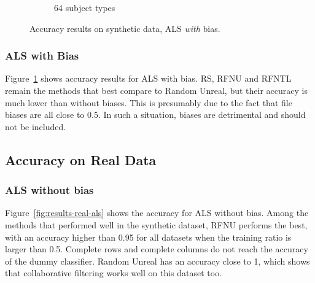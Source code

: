 \documentclass[10pt, conference, compsocconf]{IEEEtran}
\begin{document}
\begin{figure}
\begin{subfigure}[b]{0.3\textwidth}
        \caption{64 subject types}
\end{subfigure}
\caption{Accuracy results on synthetic data, ALS \emph{with} bias.}
\label{fig:results-synthetic-als-bias}
\end{figure}

\subsubsection{ALS with Bias}

Figure~\ref{fig:results-synthetic-als-bias} shows accuracy results for 
ALS with bias. RS, RFNU and RFNTL remain the methods that best compare 
to Random Unreal, but their accuracy is much lower than without 
biases. This is presumably due to 
the fact that file biases are all close to 0.5. 
In such a situation, biases are detrimental and should not be included.

\subsection{Accuracy on  Real Data}

\subsubsection{ALS without bias}

Figure~\ref{fig:results-real-als} shows the accuracy for ALS without bias. Among the methods that performed 
well in the synthetic dataset, RFNU performs the best, with an accuracy 
higher than 0.95 for all datasets when the training ratio is larger 
than 0.5. Complete rows and complete columns do not reach the accuracy of 
the dummy classifier. Random Unreal has an 
accuracy close to 1, which shows that collaborative filtering works 
well on this dataset too.
\end{document}
